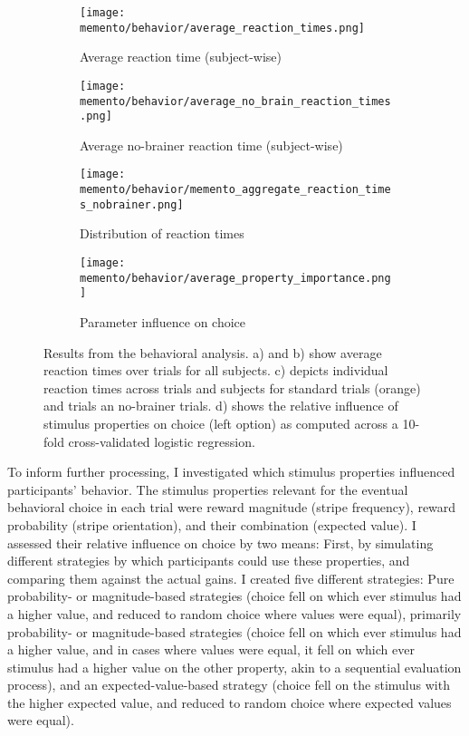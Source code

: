 \begin{figure}[H]
	\centering
	\begin{subfigure}[t]{0.45\textwidth}
		\texttt{[image: memento/behavior/average\_reaction\_times.png]}
		\caption{Average reaction time (subject-wise)}
		\label{fig:avgreactions}
	\end{subfigure}
	\begin{subfigure}[t]{0.45\textwidth}
		\texttt{[image: memento/behavior/average\_no\_brain\_reaction\_times.png]}
		\caption{Average no-brainer reaction time (subject-wise)}
		\label{fig:avgreactionsnobrain}
	\end{subfigure}
	\begin{subfigure}[t]{0.45\textwidth}
		\texttt{[image: memento/behavior/memento\_aggregate\_reaction\_times\_nobrainer.png]}
		\caption{Distribution of reaction times}
		\label{fig:reactiontimes}
	\end{subfigure}
	\begin{subfigure}[t]{0.45\textwidth}
		\texttt{[image: memento/behavior/average\_property\_importance.png]}
		\caption{Parameter influence on choice}
		\label{fig:logregbehavior}
	\end{subfigure}

	\caption[Behavioral results]{Results from the behavioral analysis. a) and b) show average reaction times over trials for all subjects. c) depicts individual reaction times across trials and subjects for standard trials (orange) and trials an no-brainer trials. d) shows the relative influence of stimulus properties on choice (left option) as computed across a 10-fold cross-validated logistic regression.}
	\label{fig:behav}
\end{figure}
To inform further processing, I investigated which stimulus properties influenced participants' behavior.
The stimulus properties relevant for the eventual behavioral choice in each trial were reward magnitude (stripe frequency), reward probability (stripe orientation), and their combination (expected value).
I assessed their relative influence on choice by two means: First, by simulating different strategies by which participants could use these properties, and comparing them against the actual gains.
I created five different strategies: Pure probability- or magnitude-based strategies (choice fell on which ever stimulus had a higher value, and reduced to random choice where values were equal), primarily probability- or magnitude-based strategies (choice fell on which ever stimulus had a higher value, and in cases where values were equal, it fell on which ever stimulus had a higher value on the other property, akin to a sequential evaluation process), and an expected-value-based strategy (choice fell on the stimulus with the higher expected value, and reduced to random choice where expected values were equal).
